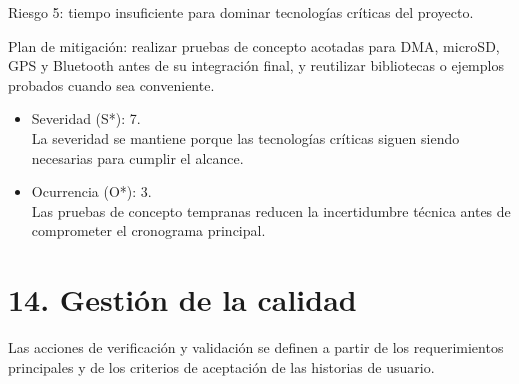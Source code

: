 \documentclass[
11pt, %
]{charter}
\begin{document}
Riesgo 5: tiempo insuficiente para dominar tecnologías críticas del proyecto.

Plan de mitigación: realizar pruebas de concepto acotadas para DMA, microSD, GPS y Bluetooth antes de su integración final, y reutilizar bibliotecas o ejemplos probados cuando sea conveniente.
\begin{itemize}
	\item Severidad (S*): 7.\\
	La severidad se mantiene porque las tecnologías críticas siguen siendo necesarias para cumplir el alcance.
	\item Ocurrencia (O*): 3.\\
	Las pruebas de concepto tempranas reducen la incertidumbre técnica antes de comprometer el cronograma principal.
\end{itemize}

\section{14. Gestión de la calidad}
\label{sec:calidad}

Las acciones de verificación y validación se definen a partir de los requerimientos principales y de los criterios de aceptación de las historias de usuario.
\end{document}
